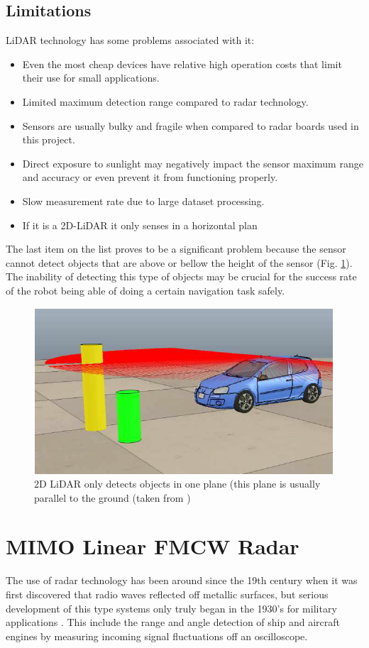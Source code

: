 \subsection{Limitations}
\ac{LiDAR} technology has some problems associated with it:
\begin{itemize}
\item{Even the most cheap devices have relative high operation costs that limit their use for small applications.}  
\item{Limited maximum detection range compared to radar technology.}  
\item{Sensors are usually bulky and fragile when compared to radar boards used in this project.} 
\item{Direct exposure to sunlight may negatively impact the sensor maximum range and accuracy or even prevent it from functioning properly.} 
\item{Slow measurement rate due to large dataset processing.} 
\item {If it is a 2D-\ac{LiDAR} it only senses in a horizontal plan}
\end{itemize}
The last item on the list proves to be a significant problem because the sensor cannot detect objects that are above or bellow the height of the sensor (Fig. \ref{fig:2dlidar}). The inability of detecting this type of objects may be crucial for the success rate of the robot being able of doing a certain navigation task safely.
\begin{figure}[ht]
    \centering
    \includegraphics[scale=0.7]{imgs/chapter2/lidar2d.png}
    \caption[2D \ac{LiDAR} only detecting objects in one plane ]{2D \ac{LiDAR} only detects objects in one plane (this plane is usually parallel to the ground (taken from \cite{yalcin2013approaches})}
    \label{fig:2dlidar}
\end{figure}


\section{MIMO Linear FMCW Radar}
The use of \ac{radar} technology has been around since the 19th century when it was first discovered that radio waves reflected off metallic surfaces, but serious development of this type systems only truly began in the 1930's for military applications \cite{radarhistory}. This include the range and angle detection of ship and aircraft engines by measuring incoming signal fluctuations off an oscilloscope. 

